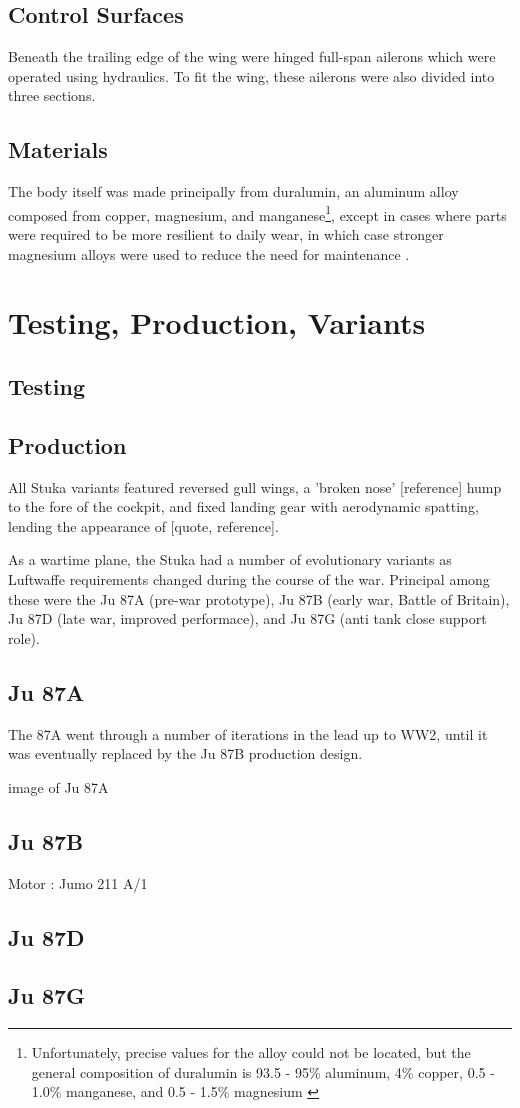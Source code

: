 \documentclass[a4paper, fontsize=11pt]{scrartcl} %
\begin{document}
\subsection{Control Surfaces}
Beneath the trailing edge of the wing were hinged full-span
ailerons which were operated using hydraulics. To fit the wing, these
ailerons were also divided into three sections.

\subsection{Materials}

The body itself was made principally from
duralumin, an aluminum alloy composed from copper, magnesium, and
manganese\footnote{Unfortunately, precise values for the alloy could not
  be located, but the general composition of duralumin is 93.5 - 95\% aluminum, 4\%
  copper, 0.5 - 1.0\% manganese, and 0.5 - 1.5\%
  magnesium \autocite[p.~102-103]{wardlaw33}},
  except in cases where parts were required to be more resilient to daily
  wear, in which case stronger magnesium alloys were used to reduce the
  need for maintenance \autocite[p.~15]{guardia14}.

  \section{Testing, Production, Variants}
  \subsection{Testing}
  \subsection{Production}
  All Stuka variants featured reversed gull wings, a 'broken nose' [reference]
  hump to the fore of the cockpit, and fixed landing gear with aerodynamic
  spatting\autocite[p.~4]{curry88}, lending the
  appearance of [quote, reference]. %

  As a wartime plane, the Stuka had a number of evolutionary variants as
  Luftwaffe requirements changed during the course of the war. Principal among these were the Ju 87A
  (pre-war prototype), Ju 87B (early war, Battle of Britain), Ju 87D
  (late war, improved performace), and Ju 87G (anti tank close support
  role).
  \subsection{Ju 87A}
  The 87A went through a number of iterations in the lead up to WW2,
  until it was eventually replaced by the Ju 87B production design.

  {image of Ju 87A}
  \subsection{Ju 87B}
  Motor : Jumo 211 A/1
  \subsection{Ju 87D}
  \subsection{Ju 87G}
  \printbibliography
  
\end{document}
